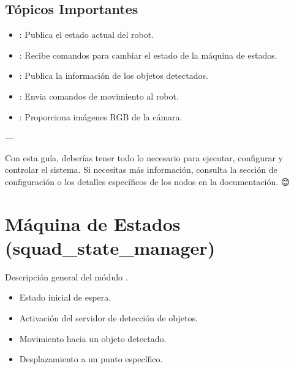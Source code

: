 \documentclass[a4paper,10pt,spanish]{sphinxmanual}
\begin{document}
\subsection{Tópicos Importantes}
\label{\detokenize{uso:topicos-importantes}}\begin{itemize}
\item {} 
\sphinxAtStartPar
{}:
Publica el estado actual del robot.

\item {} 
\sphinxAtStartPar
{}:
Recibe comandos para cambiar el estado de la máquina de estados.

\item {} 
\sphinxAtStartPar
{}:
Publica la información de los objetos detectados.

\item {} 
\sphinxAtStartPar
{}:
Envia comandos de movimiento al robot.

\item {} 
\sphinxAtStartPar
{}:
Proporciona imágenes RGB de la cámara.

\end{itemize}

\sphinxAtStartPar
—

\sphinxAtStartPar
Con esta guía, deberías tener todo lo necesario para ejecutar, configurar y controlar el sistema. Si necesitas más información, consulta la sección de configuración o los detalles específicos de los nodos en la documentación. 😊

\sphinxstepscope


\section{Máquina de Estados (squad\_state\_manager)}
\label{\detokenize{squad_state_manager:maquina-de-estados-squad-state-manager}}\label{\detokenize{squad_state_manager::doc}}
\sphinxAtStartPar
Descripción general del módulo .

\sphinxAtStartPar
{}
\begin{itemize}
\item {} 
\sphinxAtStartPar
{} Estado inicial de espera.

\item {} 
\sphinxAtStartPar
{} Activación del servidor de detección de objetos.

\item {} 
\sphinxAtStartPar
{} Movimiento hacia un objeto detectado.

\item {} 
\sphinxAtStartPar
{} Desplazamiento a un punto específico.

\end{itemize}
\end{document}
